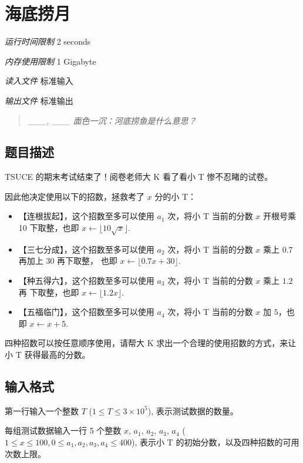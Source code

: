 \section[L. 海底捞月]{ 海底捞月}

\textit{运行时间限制}   2 seconds

\textit{内存使用限制} 1 Gigabyte

\textit{读入文件} \qquad 标准输入

\textit{输出文件} \qquad 标准输出


\begin{quote}
	\textit{\_\_\_, \_\_\_ 面色一沉：河底捞鱼是什么意思？}
\end{quote}

\subsection{题目描述}

TSUCE 的期末考试结束了！阅卷老师大 K 看了看小 T 惨不忍睹的试卷。

因此他决定使用以下的招数，拯救考了 $x$ 分的小 T：

\begin{itemize}
	\item 【连根拔起】，这个招数至多可以使用 $a_1$ 次，将小 T 当前的分数 $x$ 开根号乘 10 下取整，也即 $x \leftarrow \lfloor 10 \sqrt{x} \rfloor$.
	\item 【三七分成】，这个招数至多可以使用 $a_2$ 次，将小 T 当前的分数 $x$ 乘上 $0.7$ 再加上 30 再下取整， 也即 $x \leftarrow \lfloor 0.7x + 30 \rfloor$.
	\item 【种五得六】，这个招数至多可以使用 $a_3$ 次，将小 T 当前的分数 $x$ 乘上 $1.2$ 再 下取整，也即 $x \leftarrow \lfloor 1.2x \rfloor$.
	\item 【五福临门】，这个招数至多可以使用 $a_4$ 次，将小 T 当前的分数 $x$ 加 $5$，也即 $x \leftarrow x + 5$.
\end{itemize}

四种招数可以按任意顺序使用，请帮大 K 求出一个合理的使用招数的方式，来让小 T 获得最高的分数。

\subsection{输入格式}

第一行输入一个整数 $T$ ($1 \le T \le 3 \times 10^5$), 表示测试数据的数量。

每组测试数据输入一行 5 个整数 $x$, $a_1$, $a_2$, $a_3$, $a_4$ ($1 \le x \le 100, 0 \le a_1, a_2, a_3, a_4 \le 400$), 表示小 T 的初始分数，以及四种招数的可用次数上限。

